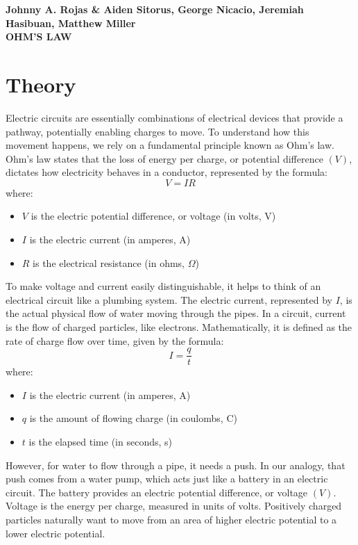 \documentclass[12pt]{article}
\begin{document}
\begin{center}
    {\textbf{Johnny A. Rojas \& Aiden Sitorus, George Nicacio, Jeremiah
        Hasibuan, Matthew Miller}}\\
    {\Large \textbf{OHM'S LAW}}
\end{center}

\section{Theory}

Electric circuits are essentially combinations of electrical devices that
provide a pathway, potentially enabling charges to move. To understand how this
movement happens, we rely on a fundamental principle known as Ohm's law. Ohm's
law states that the loss of energy per charge, or potential difference $(V)$,
dictates how electricity behaves in a conductor, represented by the
formula:
\begin{equation}
    V = IR
\end{equation}
where:
\begin{itemize}
    \item $V$ is the electric potential difference, or voltage (in volts, V)
    \item $I$ is the electric current (in amperes, A)
    \item $R$ is the electrical resistance (in ohms, $\Omega$)
\end{itemize}

To make voltage and current easily distinguishable, it helps to think of an
electrical circuit like a plumbing system. The electric current, represented by
$I$, is the actual physical flow of water moving through the pipes. In a circuit,
current is the flow of charged particles, like electrons. Mathematically, it is
defined as the rate of charge flow over time, given by the formula:
\begin{equation}
    I = \frac{q}{t}
\end{equation}
where:
\begin{itemize}
    \item $I$ is the electric current (in amperes, A)
    \item $q$ is the amount of flowing charge (in coulombs, C)
    \item $t$ is the elapsed time (in seconds, s)
\end{itemize}

However, for water to flow through a pipe, it needs a push. In our analogy, that
push comes from a water pump, which acts just like a battery in an electric
circuit. The battery provides an electric potential difference, or voltage $(V)$.
Voltage is the energy per charge, measured in units of volts. Positively charged
particles naturally want to move from an area of higher electric potential to a
lower electric potential.
\end{document}
